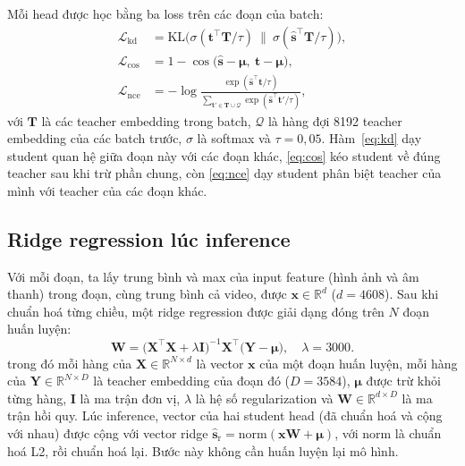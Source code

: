 \documentclass{IEEEtran}
\begin{document}
Mỗi head được học bằng ba loss trên các đoạn của batch:
\begin{align}
\mathcal{L}_{\mathrm{kd}} &= \mathrm{KL}\big(\sigma(\mathbf{t}^{\top}\mathbf{T}/\tau)\ \big\|\ \sigma(\hat{\mathbf{s}}^{\top}\mathbf{T}/\tau)\big), \label{eq:kd}\\
\mathcal{L}_{\mathrm{cos}} &= 1 - \cos\big(\hat{\mathbf{s}} - \boldsymbol{\mu},\ \mathbf{t} - \boldsymbol{\mu}\big), \label{eq:cos}\\
\mathcal{L}_{\mathrm{nce}} &= -\log \frac{\exp(\hat{\mathbf{s}}^{\top}\mathbf{t}/\tau)}{\sum_{\mathbf{t}' \in \mathbf{T} \cup \mathcal{Q}} \exp(\hat{\mathbf{s}}^{\top}\mathbf{t}'/\tau)}, \label{eq:nce}
\end{align}
với $\mathbf{T}$ là các teacher embedding trong batch, $\mathcal{Q}$ là hàng đợi 8192 teacher embedding của các batch trước, $\sigma$ là softmax và $\tau = 0{,}05$. Hàm~\eqref{eq:kd} dạy student quan hệ giữa đoạn này với các đoạn khác, \eqref{eq:cos} kéo student về đúng teacher sau khi trừ phần chung, còn \eqref{eq:nce} dạy student phân biệt teacher của mình với teacher của các đoạn khác.

\subsection{Ridge regression lúc inference}
Với mỗi đoạn, ta lấy trung bình và max của input feature (hình ảnh và âm thanh) trong đoạn, cùng trung bình cả video, được $\mathbf{x} \in \mathbb{R}^{d}$ ($d = 4608$). Sau khi chuẩn hoá từng chiều, một ridge regression được giải dạng đóng trên $N$ đoạn huấn luyện:
\begin{equation}
\label{eq:ridge}
\mathbf{W} = \big(\mathbf{X}^{\top}\mathbf{X} + \lambda \mathbf{I}\big)^{-1} \mathbf{X}^{\top} \big(\mathbf{Y} - \boldsymbol{\mu}\big), \quad \lambda = 3000.
\end{equation}
trong đó mỗi hàng của $\mathbf{X} \in \mathbb{R}^{N \times d}$ là vector $\mathbf{x}$ của một đoạn huấn luyện, mỗi hàng của $\mathbf{Y} \in \mathbb{R}^{N \times D}$ là teacher embedding của đoạn đó ($D = 3584$), $\boldsymbol{\mu}$ được trừ khỏi từng hàng, $\mathbf{I}$ là ma trận đơn vị, $\lambda$ là hệ số regularization và $\mathbf{W} \in \mathbb{R}^{d \times D}$ là ma trận hồi quy.
Lúc inference, vector của hai student head (đã chuẩn hoá và cộng với nhau) được cộng với vector ridge $\hat{\mathbf{s}}_{\mathrm{r}} = \mathrm{norm}(\mathbf{x}\mathbf{W} + \boldsymbol{\mu})$, với $\mathrm{norm}$ là chuẩn hoá L2, rồi chuẩn hoá lại. Bước này không cần huấn luyện lại mô hình.
\end{document}

